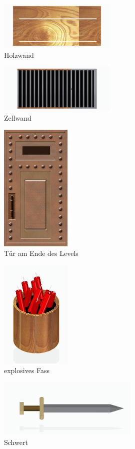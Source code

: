 \documentclass[10pt]{article}
\begin{document}
\begin{figure}[H]
	\centering
	\includegraphics[width=0.5\textwidth]{Holzwandhindernis}
	\caption{Holzwand
		\label{fig:woodwall}}
\end{figure}

\begin{figure}[H]
	\centering
	\includegraphics[width=0.5\textwidth]{zellwand}
	\caption{Zellwand
		\label{fig:prisonwall}}
\end{figure}

\begin{figure}[H]
	\centering
	\includegraphics[width=0.3\textwidth]{door}
	\caption{Tür am Ende des Levels
		\label{fig:door}}
\end{figure}

\begin{figure}[H]
	\centering
	\includegraphics[width=0.3\textwidth]{barrel}
	\caption{explosives Fass
		\label{fig:barrel}}
\end{figure}

\begin{figure}[H]
	\centering
	\includegraphics[width=0.6\textwidth]{Schwert}
	\caption{Schwert
		\label{fig:sword}}
\end{figure}
	
\end{document}
